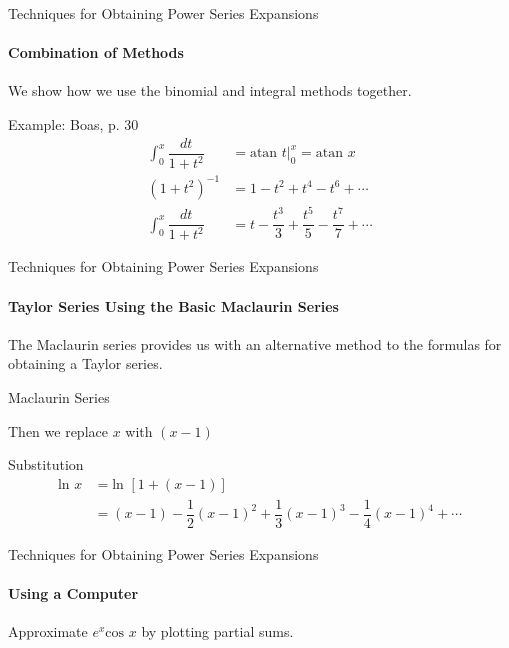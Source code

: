 \documentclass{beamer}
\begin{document}
\begin{frame}{Techniques for Obtaining Power Series Expansions}
   	\framesubtitle{Combination of Methods}
	We show how we use the binomial and integral methods together.
	\begin{exampleblock}{Example: Boas, p. 30}
	\begin{align*}
	\int_{0}^{x}\dfrac{dt}{1+t^{2}} &= \mbox{atan\ }t\Big|_{0}^{x} = \mbox{atan\ }x \\
	(1+t^{2})^{-1} &= 1 - t^{2}+ t^{4}- t^{6}+\cdots \\
	\int_{0}^{x}\dfrac{dt}{1+t^{2}} &= t - \dfrac{t^{3}}{3} + \dfrac{t^{5}}{5} - \dfrac{t^{7}}{7} +\cdots
	\end{align*}
	\end{exampleblock}
\end{frame}
  
\begin{frame}{Techniques for Obtaining Power Series Expansions}
    \framesubtitle{Taylor Series Using the Basic Maclaurin Series}
    The Maclaurin series provides us with an alternative method to the formulas for obtaining a Taylor series.
   \begin{exampleblock}{Maclaurin Series}
   \end{exampleblock}
   Then we replace $x$ with $(x-1)$
   \begin{exampleblock}{Substitution}
   	\begin{align*}
   	    \mbox{ln\ } x&= \mbox{ln\ } [1+(x-1)] \\
	    &= (x-1)-\dfrac{1}{2}(x-1)^2+\dfrac{1}{3}(x-1)^3-\dfrac{1}{4}(x-1)^4+\cdots
	\end{align*}
   \end{exampleblock}
\end{frame}
  
\begin{frame}{Techniques for Obtaining Power Series Expansions}
    	\framesubtitle{Using a Computer}
	Approximate $e^{x}\mbox{cos\ }x$ by plotting partial sums.
\end{frame}
  
\end{document}
